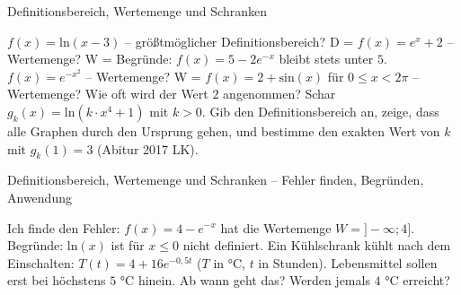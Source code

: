 \setcounter{aufgabe}{14}

\begin{aufgabe}{Definitionsbereich, Wertemenge und Schranken}
\begin{teile}
\teil $f(x) = \mathrm{ln}(x - 3)$ – größtmöglicher Definitionsbereich? D = \leerfeld
\teil $f(x) = e^x + 2$ – Wertemenge? W = \leerfeld
\teil Begründe: $f(x) = 5 - 2e^{-x}$ bleibt stets unter $5$.
\teil $f(x) = e^{-x^2}$ – Wertemenge? W = \leerfeld
\teil $f(x) = 2 + \mathrm{sin}(x)$ für $0 \le x < 2\pi$ – Wertemenge? Wie oft wird der Wert $2$ angenommen?
\teil Schar $g_k(x) = \mathrm{ln}(k \cdot x^4 + 1)$ mit $k > 0$. Gib den Definitionsbereich an, zeige, dass alle Graphen durch den Ursprung gehen, und bestimme den exakten Wert von $k$ mit $g_k(1) = 3$ \hfill (Abitur 2017 LK).
\end{teile}
\end{aufgabe}

\begin{aufgabe}{Definitionsbereich, Wertemenge und Schranken – Fehler finden, Begründen, Anwendung}
\begin{teile}
\teil Ich finde den Fehler: $f(x) = 4 - e^{-x}$ hat die Wertemenge $W = ]-\infty; 4]$.
\teil Begründe: $\mathrm{ln}(x)$ ist für $x \le 0$ nicht definiert.
\teil Ein Kühlschrank kühlt nach dem Einschalten: $T(t) = 4 + 16e^{-0{,}5t}$ ($T$ in °C, $t$ in Stunden). Lebensmittel sollen erst bei höchstens $5$ °C hinein. Ab wann geht das? Werden jemals $4$ °C erreicht?
\end{teile}
\end{aufgabe}
